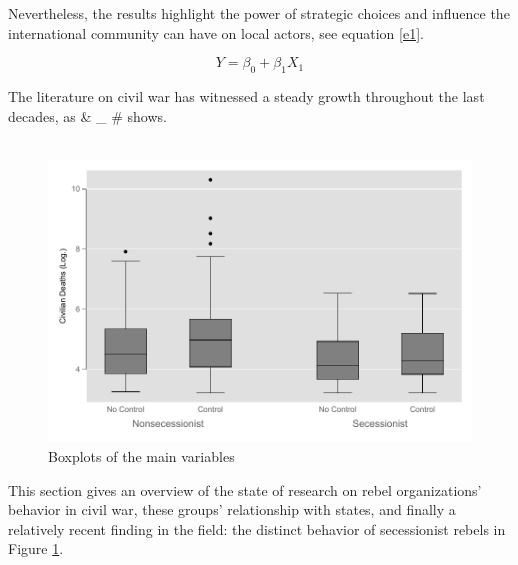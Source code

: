 \documentclass[12pt]{article} %
\begin{document}
\pagebreak

Nevertheless, the results highlight the power of strategic choices and influence the international community can have on local actors, see equation \eqref{e1}.

\begin{equation}\label{e1}
	Y = \beta_{0} + \beta_{1}X_{1}
\end{equation}

The literature on civil war has witnessed a steady growth throughout the last decades, as \& \_ \# shows. \\ \

\pagebreak

\begin{figure}[t!]\caption{Boxplots of the main variables}\label{f1}
	\includegraphics[width=\textwidth]{DVIVTERRSECbox.pdf}
\end{figure} 

This section gives an overview of the state of research on rebel organizations' behavior in civil war, these groups' relationship with states, and finally a relatively recent finding in the field: the distinct behavior of secessionist rebels in Figure \ref{f1}. \\ \
\end{document}
